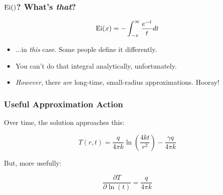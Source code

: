 \documentclass{beamer}
\begin{document}
\begin{frame}
\frametitle{\(\textrm{Ei}()\)? What's \emph{that}?}

\[\textrm{Ei}(x) = -\int_{-x}^{\infty} \frac{e^{-t}}{t}dt \]

\begin{itemize}
\item ...in \emph{this} case. Some people define it differently.
\item You can't do that integral analytically, unfortunately.
\item \emph{However}, there \emph{are} long-time, small-radius approximations.
Hooray!
\end{itemize}
\end{frame}


\begin{frame}
\frametitle{Useful Approximation Action}

Over time, the solution approaches this:

\begin{equation*}
T(r,t) = \frac{q}{4\pi k}\ln\left(\frac{4kt}{r^2}\right) - \frac{\gamma q}{4\pi k}
\end{equation*}

But, more usefully:

\begin{equation*}
\frac{\partial T}{\partial \ln(t)} = \frac{q}{4\pi k}
\end{equation*}

\end{frame}
\end{document}
